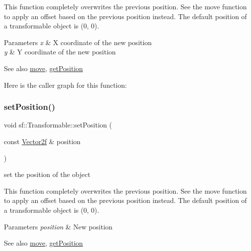 This function completely overwrites the previous position. See the move function to apply an offset based on the previous position instead. The default position of a transformable object is (0, 0).


\begin{DoxyParams}{Parameters}
{\em x} & X coordinate of the new position \\
\hline
{\em y} & Y coordinate of the new position\\
\hline
\end{DoxyParams}
\begin{DoxySeeAlso}{See also}
\hyperlink{classsf_1_1_transformable_a86b461d6a941ad390c2ad8b6a4a20391}{move}, \hyperlink{classsf_1_1_transformable_a73f9739bc6e74db2cea154bc8e94ec46}{get\+Position} 
\end{DoxySeeAlso}
Here is the caller graph for this function\+:
\mbox{\label{classsf_1_1_transformable_af1a42209ce2b5d3f07b00f917bcd8015}} 
\subsubsection{\texorpdfstring{set\+Position()}{setPosition()}\hspace{0.1cm}{\footnotesize\ttfamily [2/2]}}
{\footnotesize\ttfamily void sf\+::\+Transformable\+::set\+Position (\begin{DoxyParamCaption}\item[{const \hyperlink{classsf_1_1_vector2}{Vector2f} \&}]{position }\end{DoxyParamCaption})}



set the position of the object 

This function completely overwrites the previous position. See the move function to apply an offset based on the previous position instead. The default position of a transformable object is (0, 0).


\begin{DoxyParams}{Parameters}
{\em position} & New position\\
\hline
\end{DoxyParams}
\begin{DoxySeeAlso}{See also}
\hyperlink{classsf_1_1_transformable_a86b461d6a941ad390c2ad8b6a4a20391}{move}, \hyperlink{classsf_1_1_transformable_a73f9739bc6e74db2cea154bc8e94ec46}{get\+Position} 
\end{DoxySeeAlso}
\mbox{\label{classsf_1_1_transformable_a32baf2bf1a74699b03bf8c95030a38ed}} 
